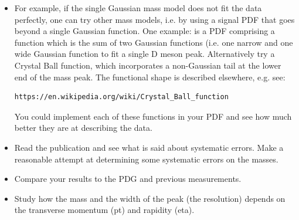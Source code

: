 \begin{enumerate}
\begin{itemize} 
\item For example, if the single
Gaussian mass model does not fit the data perfectly, one can try other mass models,
i.e. by using a signal PDF that goes beyond a single Gaussian
function. One example: is a PDF comprising a function which is the sum of two Gaussian functions (i.e. one
narrow and one wide Gaussian function to fit a single D meson
peak. Alternatively try a Crystal Ball function, which incorporates a non-Gaussian tail at the lower end of
the mass peak. The functional shape is described elsewhere, e.g. see:
\begin{verbatim}
https://en.wikipedia.org/wiki/Crystal_Ball_function 
\end{verbatim} 
You could implement each of these functions in your PDF and see how much better
they are at describing the data.
\item Read the publication and see what is said about systematic errors. Make a reasonable
attempt at determining some systematic errors on the masses.
\item Compare your results to the PDG and previous measurements.
\item Study how the mass and the width of the peak (the resolution)
  depends on the transverse momentum (pt) and rapidity (eta).
\end{itemize}

\end{enumerate}
